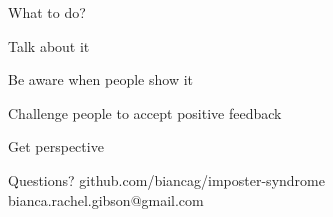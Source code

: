 \documentclass[aspectratio=169]{beamer}
\begin{document}
\begin{frame}
  \begin{center}
    \Huge What to do?
    \small
  \end{center}
\end{frame}

\begin{frame}
  \begin{center}
    \Huge Talk about it
    \small
  \end{center}
\end{frame}

\begin{frame}
  \begin{center}
    \Huge Be aware when people show it
    \small
  \end{center}
\end{frame}

\begin{frame}
  \begin{center}
    \Huge Challenge people to accept positive feedback
  \end{center}
\end{frame}

\begin{frame}
  \begin{center}
    \Huge Get perspective
    \small
  \end{center}
\end{frame}

\begin{frame}
  \begin{center}
    \Huge Questions?
    github.com/biancag/imposter-syndrome
    bianca.rachel.gibson@gmail.com
  \end{center}
\end{frame}

\begin{frame}
 

  
\end{frame}
\end{document}
